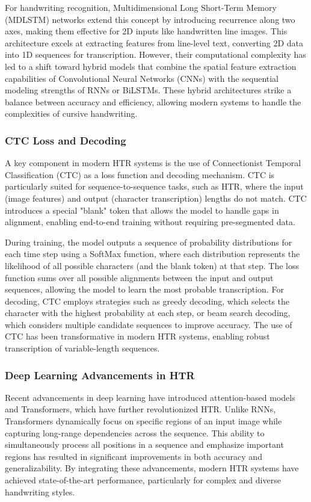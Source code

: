 \documentclass[conference]{IEEEtran}
\begin{document}
For handwriting recognition, Multidimensional Long Short-Term Memory (MDLSTM) networks extend this concept by introducing recurrence along two axes, making them effective for 2D inputs like handwritten line images. This architecture excels at extracting features from line-level text, converting 2D data into 1D sequences for transcription. However, their computational complexity has led to a shift toward hybrid models that combine the spatial feature extraction capabilities of Convolutional Neural Networks (CNNs) with the sequential modeling strengths of RNNs or BiLSTMs. These hybrid architectures strike a balance between accuracy and efficiency, allowing modern systems to handle the complexities of cursive handwriting.


\subsubsection{CTC Loss and Decoding}

A key component in modern HTR systems is the use of Connectionist Temporal Classification (CTC) as a loss function and decoding mechanism. CTC is particularly suited for sequence-to-sequence tasks, such as HTR, where the input (image features) and output (character transcription) lengths do not match. CTC introduces a special "blank" token that allows the model to handle gaps in alignment, enabling end-to-end training without requiring pre-segmented data.

During training, the model outputs a sequence of probability distributions for each time step using a SoftMax function, where each distribution represents the likelihood of all possible characters (and the blank token) at that step. The loss function sums over all possible alignments between the input and output sequences, allowing the model to learn the most probable transcription. For decoding, CTC employs strategies such as greedy decoding, which selects the character with the highest probability at each step, or beam search decoding, which considers multiple candidate sequences to improve accuracy. The use of CTC has been transformative in modern HTR systems, enabling robust transcription of variable-length sequences.

\subsubsection{Deep Learning Advancements in HTR}

Recent advancements in deep learning have introduced attention-based models and Transformers, which have further revolutionized HTR. Unlike RNNs, Transformers dynamically focus on specific regions of an input image while capturing long-range dependencies across the sequence. This ability to simultaneously process all positions in a sequence and emphasize important regions has resulted in significant improvements in both accuracy and generalizability. By integrating these advancements, modern HTR systems have achieved state-of-the-art performance, particularly for complex and diverse handwriting styles.
\end{document}
